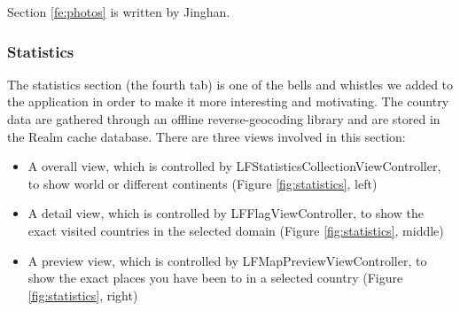 \documentclass[12pt,a4paper]{article}
\renewcommand\texttt[1]{{\ttfamily\color{textttColor}#1}}
\begin{document}
            
            \footnotesize
            Section \ref{fe:photos} is written by Jinghan.
            \normalsize
            
            \subsubsection{Statistics} %
            \label{fe:statistics}
            
            The statistics section (the fourth tab) is one of the bells and whistles we added to the application in order to make it more interesting and motivating. The country data are gathered through an offline reverse-geocoding library and are stored in the Realm cache database. There are three views involved in this section:
            
            \begin{itemize}
                \setlength\itemsep{-0.5em}
                \item A overall view, which is controlled by \texttt{LFStatisticsCollectionViewController}, to show world or different continents (Figure \ref{fig:statistics}, left)
                \item A detail view, which is controlled by \texttt{LFFlagViewController}, to show the exact visited countries in the selected domain (Figure \ref{fig:statistics}, middle)
                \item A preview view, which is controlled by \texttt{LFMapPreviewViewController}, to show the exact places you have been to in a selected country (Figure \ref{fig:statistics}, right)
            \end{itemize}
            
\end{document}
